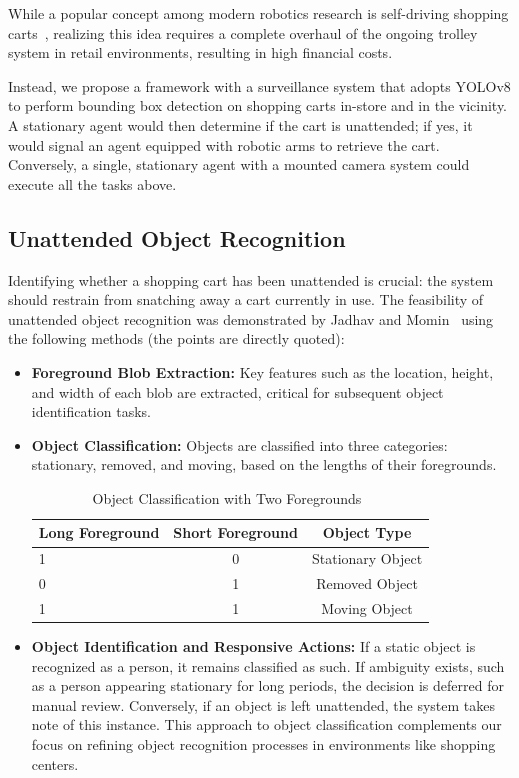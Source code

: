 \documentclass[10pt,twocolumn,letterpaper]{article}
\begin{document}
While a popular concept among modern robotics research is self-driving shopping carts~\cite{self-driving}, realizing this idea requires a complete overhaul of the ongoing trolley system in retail environments, resulting in high financial costs.

Instead, we propose a framework with a surveillance system that adopts YOLOv8 to perform bounding box detection on shopping carts in-store and in the vicinity. A stationary agent would then determine if the cart is unattended; if yes, it would signal an agent equipped with robotic arms to retrieve the cart. Conversely, a single, stationary agent with a mounted camera system could execute all the tasks above.

\subsection{Unattended Object Recognition}
Identifying whether a shopping cart has been unattended is crucial: the system should restrain from snatching away a cart currently in use. The feasibility of unattended object recognition was demonstrated by Jadhav and Momin~\cite{detection-identifcation} using the following methods (the points are directly quoted):
\begin{itemize}
    \item{\textbf{Foreground Blob Extraction:}}
    Key features such as the location, height, and width of each blob are extracted, critical for subsequent object identification tasks.
    \item{\textbf{Object Classification:}}
    Objects are classified into three categories: stationary, removed, and moving, based on the lengths of their foregrounds.
\begin{table}[h]
\centering
\begin{tabular}{lcc}
\toprule
\textbf{Long Foreground} & \textbf{Short Foreground} & \textbf{Object Type} \\
\midrule
1 & 0 & Stationary Object \\
0 & 1 & Removed Object \\
1 & 1 & Moving Object \\
\bottomrule
\end{tabular}
\caption{Object Classification with Two Foregrounds~\cite{detection-identifcation}}
\label{tab:object_classification}
\end{table}
\item{\textbf{Object Identification and Responsive Actions:}}
If a static object is recognized as a person, it remains classified as such. If ambiguity exists, such as a person appearing stationary for long periods, the decision is deferred for manual review. Conversely, if an object is left unattended, the system takes note of this instance. This approach to object classification complements our focus on refining object recognition processes in environments like shopping centers.
\end{itemize}
\end{document}
